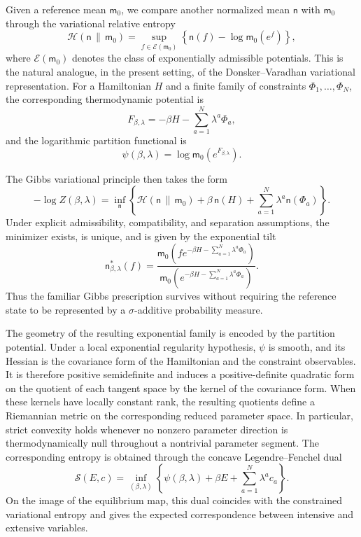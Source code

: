 \documentclass[11pt,reqno]{amsart}
\begin{document}
Given a reference mean $\mathsf m_0$, we compare another normalized mean
$\mathsf n$ with $\mathsf m_0$ through the variational relative entropy
\[
\mathcal H(\mathsf n\,\|\,\mathsf m_0)
=
\sup_{f\in\mathcal E(\mathsf m_0)}
\left\{
\mathsf n(f)
-
\log\mathsf m_0(e^f)
\right\},
\]
where $\mathcal E(\mathsf m_0)$ denotes the class of exponentially
admissible potentials. This is the natural analogue, in the present
setting, of the Donsker--Varadhan variational representation. For a
Hamiltonian $H$ and a finite family of constraints
$\Phi_1,\ldots,\Phi_N$, the corresponding thermodynamic potential is
\[
F_{\beta,\lambda}
=
-\beta H-\sum_{a=1}^{N}\lambda^a\Phi_a,
\]
and the logarithmic partition functional is
\[
\psi(\beta,\lambda)
=
\log\mathsf m_0(e^{F_{\beta,\lambda}}).
\]

The Gibbs variational principle then takes the form
\[
-\log Z(\beta,\lambda)
=
\inf_{\mathsf n}
\left\{
\mathcal H(\mathsf n\,\|\,\mathsf m_0)
+
\beta\,\mathsf n(H)
+
\sum_{a=1}^{N}\lambda^a\mathsf n(\Phi_a)
\right\}.
\]
Under explicit admissibility, compatibility, and separation
assumptions, the minimizer exists, is unique, and is given by the
exponential tilt
\[
\mathsf n_{\beta,\lambda}^*(f)
=
\frac{
\mathsf m_0\left(
f e^{-\beta H-\sum_{a=1}^{N}\lambda^a\Phi_a}
\right)
}{
\mathsf m_0\left(
e^{-\beta H-\sum_{a=1}^{N}\lambda^a\Phi_a}
\right)
}.
\]
Thus the familiar Gibbs prescription survives without requiring the
reference state to be represented by a $\sigma$-additive probability
measure.

The geometry of the resulting exponential family is encoded by the
partition potential. Under a local exponential regularity hypothesis,
$\psi$ is smooth, and its Hessian is the covariance form of the
Hamiltonian and the constraint observables. It is therefore positive
semidefinite and induces a positive-definite quadratic form on the
quotient of each tangent space by the kernel of the covariance form.
When these kernels have locally constant rank, the resulting quotients
define a Riemannian metric on the corresponding reduced parameter
space. In particular, strict convexity holds whenever no nonzero
parameter direction is thermodynamically null throughout a nontrivial
parameter segment. The corresponding entropy is obtained through the
concave Legendre--Fenchel dual
\[
\mathcal S(E,c)
=
\inf_{(\beta,\lambda)}
\left\{
\psi(\beta,\lambda)
+
\beta E
+
\sum_{a=1}^{N}\lambda^a c_a
\right\}.
\]
On the image of the equilibrium map, this dual coincides with the
constrained variational entropy and gives the expected correspondence
between intensive and extensive variables.
\end{document}
